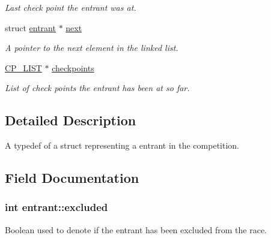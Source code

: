 \begin{DoxyCompactItemize}
\begin{DoxyCompactList}\small\item\em Last check point the entrant was at. \end{DoxyCompactList}\item 
\hypertarget{structentrant_ac1e0ab215104db8263e663d42558aa22}{struct \hyperlink{structentrant}{entrant} $\ast$ \hyperlink{structentrant_ac1e0ab215104db8263e663d42558aa22}{next}}\label{structentrant_ac1e0ab215104db8263e663d42558aa22}

\begin{DoxyCompactList}\small\item\em A pointer to the next element in the linked list. \end{DoxyCompactList}\item 
\hypertarget{structentrant_a0654f96eb21c02121b1a11c688106386}{\hyperlink{cp__time_8h_acb37ad9c25fbd95e093acd078be10932}{C\-P\-\_\-\-L\-I\-S\-T} $\ast$ \hyperlink{structentrant_a0654f96eb21c02121b1a11c688106386}{checkpoints}}\label{structentrant_a0654f96eb21c02121b1a11c688106386}

\begin{DoxyCompactList}\small\item\em List of check points the entrant has been at so far. \end{DoxyCompactList}\end{DoxyCompactItemize}



\subsection{Detailed Description}
A typedef of a struct representing a entrant in the competition. 

\subsection{Field Documentation}
\hypertarget{structentrant_aec9dc2d3c3a9bd117ca635d2acddf6e5}{
\subsubsection[{excluded}]{\setlength{\rightskip}{0pt plus 5cm}int entrant\-::excluded}}\label{structentrant_aec9dc2d3c3a9bd117ca635d2acddf6e5}


Boolean used to denote if the entrant has been excluded from the race. 

